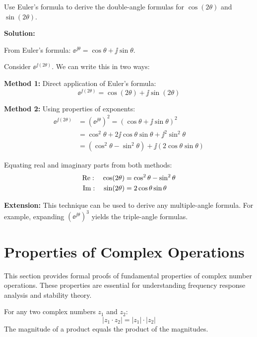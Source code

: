 \begin{examplebox}[title=Example 0.4: Deriving Trigonometric Identities Using Euler's Formula]
Use Euler's formula to derive the double-angle formulas for $\cos(2\theta)$ and $\sin(2\theta)$.

\textbf{Solution:}

From Euler's formula: $\ee^{\jj\theta} = \cos\theta + \jj\sin\theta$.

Consider $\ee^{\jj(2\theta)}$. We can write this in two ways:

\textbf{Method 1:} Direct application of Euler's formula:
\begin{equation*}
\ee^{\jj(2\theta)} = \cos(2\theta) + \jj\sin(2\theta)
\end{equation*}

\textbf{Method 2:} Using properties of exponents:
\begin{align*}
\ee^{\jj(2\theta)} &= \left(\ee^{\jj\theta}\right)^2 = (\cos\theta + \jj\sin\theta)^2 \\
&= \cos^2\theta + 2\jj\cos\theta\sin\theta + \jj^2\sin^2\theta \\
&= (\cos^2\theta - \sin^2\theta) + \jj(2\cos\theta\sin\theta)
\end{align*}

Equating real and imaginary parts from both methods:
\begin{align}
\operatorname{Re}: \quad \cos(2\theta) &= \cos^2\theta - \sin^2\theta \\
\operatorname{Im}: \quad \sin(2\theta) &= 2\cos\theta\sin\theta
\end{align}

\textbf{Extension:} This technique can be used to derive any multiple-angle formula. For example, expanding $(\ee^{\jj\theta})^3$ yields the triple-angle formulas.
\end{examplebox}

\section{Properties of Complex Operations}

This section provides formal proofs of fundamental properties of complex number operations. These properties are essential for understanding frequency response analysis and stability theory.

\begin{keyconceptbox}[title=Key Property: Magnitude of a Product]
For any two complex numbers $z_1$ and $z_2$:
\begin{equation}
|z_1 \cdot z_2| = |z_1| \cdot |z_2|
\end{equation}
The magnitude of a product equals the product of the magnitudes.
\end{keyconceptbox}

